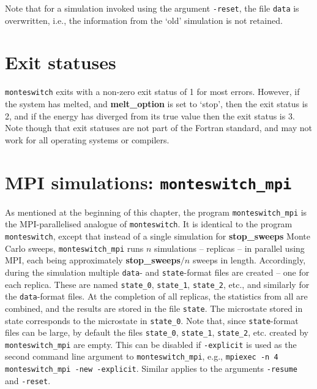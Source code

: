 \documentclass{report}
\begin{document}
Note that for a simulation invoked using the argument \texttt{-reset}, the file \texttt{data} is overwritten, i.e., the information from the `old'
simulation is not retained.

\section{Exit statuses}
\texttt{monteswitch} exits with a non-zero exit status of 1 for most errors. However, if the system has melted, and \textbf{melt\_option} is set to
`stop', then the exit status is 2, and if the energy has diverged from its true value then the exit status is 3. 
Note though that exit statuses are not part of the Fortran standard, and may not work for all operating systems or compilers. 

\section{MPI simulations: \texttt{monteswitch\_mpi}}
As mentioned at the beginning of this chapter, the program \texttt{monteswitch\_mpi} is the MPI-parallelised analogue of \texttt{monteswitch}. 
It is identical to the program \texttt{monteswitch}, except that instead of a single simulation for \textbf{stop\_sweeps} Monte Carlo sweeps, 
\texttt{monteswitch\_mpi} runs $n$ simulations -- replicas -- in parallel using MPI, each being approximately \textbf{stop\_sweeps}$/n$ sweeps in 
length. Accordingly, during the simulation multiple \texttt{data}- and \texttt{state}-format files are created -- one for each replica. These 
are named \texttt{state\_0}, \texttt{state\_1}, \texttt{state\_2}, etc., and similarly for the \texttt{data}-format files. At the completion of 
all replicas, the statistics from all are combined, and the results are stored in the file \texttt{state}. The microstate stored in state
corresponds to the microstate in \texttt{state\_0}. 
Note that, since \texttt{state}-format files can be large, by default the files \texttt{state\_0}, \texttt{state\_1}, 
\texttt{state\_2}, etc. created by \texttt{monteswitch\_mpi} are empty. This can be disabled if \texttt{-explicit} is used as the second command line 
argument to \texttt{monteswitch\_mpi}, e.g., \texttt{mpiexec -n 4 monteswitch\_mpi -new -explicit}. Similar applies to the arguments \texttt{-resume} and 
\texttt{-reset}.
\end{document}
